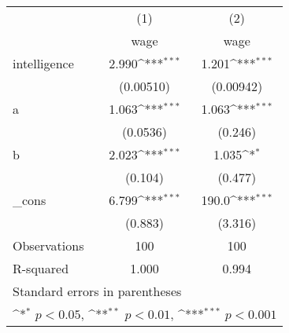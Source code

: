 {
\def\sym#1{\ifmmode^{#1}\else\(^{#1}\)\fi}
\begin{tabular}{l*{2}{c}}
\hline\hline
            &\multicolumn{1}{c}{(1)}&\multicolumn{1}{c}{(2)}\\
            &\multicolumn{1}{c}{wage}&\multicolumn{1}{c}{wage}\\
\hline
intelligence&       2.990\sym{***}&       1.201\sym{***}\\
            &   (0.00510)         &   (0.00942)         \\
[1em]
a           &       1.063\sym{***}&       1.063\sym{***}\\
            &    (0.0536)         &     (0.246)         \\
[1em]
b           &       2.023\sym{***}&       1.035\sym{*}  \\
            &     (0.104)         &     (0.477)         \\
[1em]
\_cons      &       6.799\sym{***}&       190.0\sym{***}\\
            &     (0.883)         &     (3.316)         \\
\hline
Observations&         100         &         100         \\
R-squared   &       1.000         &       0.994         \\
\hline\hline
\multicolumn{3}{l}{\footnotesize Standard errors in parentheses}\\
\multicolumn{3}{l}{\footnotesize \sym{*} \(p<0.05\), \sym{**} \(p<0.01\), \sym{***} \(p<0.001\)}\\
\end{tabular}
}
